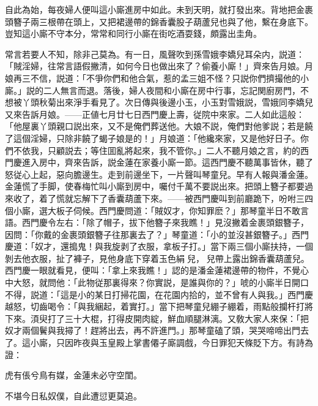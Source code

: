 自此為始，每夜婦人便叫這小廝進房中如此。未到天明，就打發出來。背地把金裹頭簪子兩三根帶在頭上，又把裙邊帶的錦香囊股子葫蘆兒也與了他，繫在身底下。豈知這小廝不守本分，常常和同行小廝在街吃酒耍錢，頗露出圭角。

常言若要人不知，除非己莫為。有一日，風聲吹到孫雪娥李嬌兒耳朵内，説道：「賊淫婦，往常言語假撇清，如何今日也做出來了？偷養小廝！」齊來告月娘。月娘再三不信，説道：「不爭你們和他合氣，惹的孟三姐不怪？只説你們擠撮他的小廝。」説的二人無言而退。落後，婦人夜間和小廝在房中行事，忘記関廚房門，不想被丫頭秋菊出來淨手看見了。次日傳與後邊小玉，小玉對雪娥説，雪娥同李嬌兒又來告訴月娘。——正値七月廿七日西門慶上壽，従院中來家。二人如此這般：「他屋裏丫頭親口説出來，又不是俺們葬送他。大娘不説，俺們對他爹説；若是饒了這個淫婦，只除非饒了蝎子娘是的！」月娘道：「他纔來家，又是他好日子。你們不依我，只顧説去；等住囬亂將起來，我不管你。」二人不聽月娘之言，約的西門慶進入房中，齊來告訴，説金蓮在家養小廝一節。這西門慶不聽萬事皆休，聽了怒従心上起，惡向膽邊生。走到前邊坐下，一片聲叫琴童兒。早有人報與潘金蓮。金蓮慌了手脚，使春梅忙叫小廝到房中，囑付千萬不要説出來。把頭上簪子都要過來收了，着了慌就忘解下了香囊葫蘆下來。——被西門慶叫到前廳跪下，吩咐三四個小廝，選大板子伺候。西門慶問道：「賊奴才，你知罪麽？」那琴童半日不敢言語。西門慶令左右：「除了帽子，拔下他簪子來我瞧！」見沒撇着金裹頭銀簪子，因問：「你戴的金裹頭銀簪子往那裏去了？」琴童道：「小的並沒甚銀簪子。」西門慶道：「奴才，還搗鬼！與我旋剥了衣服，拿板子打。」當下兩三個小廝扶持，一個剝去他衣服，扯了褲子，見他身底下穿着玉色絹𧜽兒，𧜽兒帶上露出錦香囊葫蘆兒。西門慶一眼就看見，便叫：「拿上來我瞧！」認的是潘金蓮裙邊帶的物件，不覺心中大怒，就問他：「此物従那裏得來？你實説，是誰與你的？」唬的小廝半日開口不得，説道：「這是小的某日打掃花園，在花園内拾的，並不曾有人與我。」西門慶越怒，切齒喝令：「與我綑起，着實打。」當下把琴童兒綳子綳着，雨點般攔杆打將下來。湏臾打了三十大棍，打得皮開肉綻，鮮血順腿淋漓。又敎大家人來保：「把奴才兩個鬢與我撏了！趕將出去，再不許進門。」那琴童磕了頭，哭哭啼啼出門去了。這小廝，只因昨夜與玉皇殿上掌書僊子廝調戲，今日罪犯天條貶下方。有詩為證：

\begin{myquote}
虎有倀兮鳥有媒，金蓮未必守空閨。

不堪今日私奴僕，自此遭愆更莫追。
\end{myquote}

